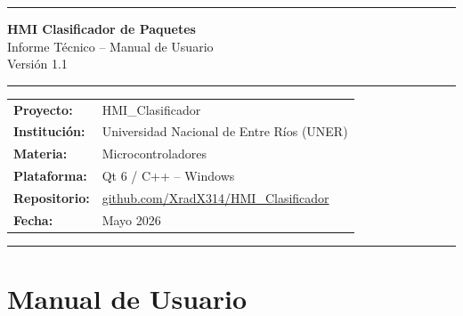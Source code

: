 \documentclass[12pt,a4paper]{report}
\begin{document}
\begin{titlepage}
  \centering
  \vspace*{1.5cm}

  {\color{unerblue}\rule{\linewidth}{3pt}}
  \vspace{0.8cm}

  {\Huge\bfseries\color{unerblue} HMI Clasificador de Paquetes}\\[0.6cm]
  {\Large Informe Técnico -- Manual de Usuario}\\[0.3cm]
  {\large Versión 1.1}

  \vspace{0.8cm}
  {\color{unerblue}\rule{\linewidth}{1pt}}

  \vspace{1.5cm}

  \begin{tabular}{ll}
    \textbf{Proyecto:}      & HMI\_Clasificador \\[4pt]
    \textbf{Institución:}   & Universidad Nacional de Entre Ríos (UNER) \\[4pt]
    \textbf{Materia:}       & Microcontroladores \\[4pt]
    \textbf{Plataforma:}    & Qt 6 / C++ -- Windows \\[4pt]
    \textbf{Repositorio:}   & \href{https://github.com/XradX314/HMI_Clasificador}{github.com/XradX314/HMI\_Clasificador} \\[4pt]
    \textbf{Fecha:}         & Mayo 2026 \\
  \end{tabular}

  \vfill
  {\color{unerblue}\rule{\linewidth}{3pt}}
\end{titlepage}

\tableofcontents
\clearpage

\part{Manual de Usuario}

\end{document}
